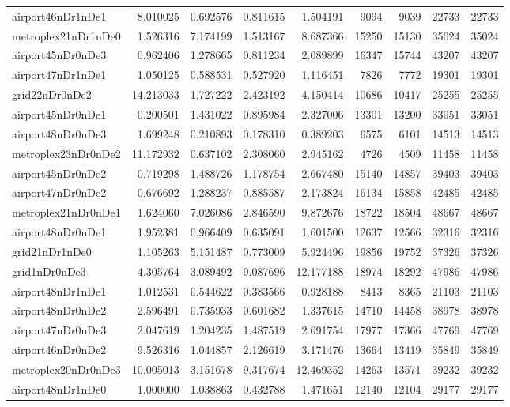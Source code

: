 \begin{longtable}{|l|r|r|r|r|r|r|r|r|}
airport46nDr1nDe1 & 8.010025 & 0.692576 & 0.811615 & 1.504191 & 9094 & 9039 & 22733 & 22733 \\
metroplex21nDr1nDe0 & 1.526316 & 7.174199 & 1.513167 & 8.687366 & 15250 & 15130 & 35024 & 35024 \\
airport45nDr0nDe3 & 0.962406 & 1.278665 & 0.811234 & 2.089899 & 16347 & 15744 & 43207 & 43207 \\
airport47nDr1nDe1 & 1.050125 & 0.588531 & 0.527920 & 1.116451 & 7826 & 7772 & 19301 & 19301 \\
grid22nDr0nDe2 & 14.213033 & 1.727222 & 2.423192 & 4.150414 & 10686 & 10417 & 25255 & 25255 \\
airport45nDr0nDe1 & 0.200501 & 1.431022 & 0.895984 & 2.327006 & 13301 & 13200 & 33051 & 33051 \\
airport48nDr0nDe3 & 1.699248 & 0.210893 & 0.178310 & 0.389203 & 6575 & 6101 & 14513 & 14513 \\
metroplex23nDr0nDe2 & 11.172932 & 0.637102 & 2.308060 & 2.945162 & 4726 & 4509 & 11458 & 11458 \\
airport45nDr0nDe2 & 0.719298 & 1.488726 & 1.178754 & 2.667480 & 15140 & 14857 & 39403 & 39403 \\
airport47nDr0nDe2 & 0.676692 & 1.288237 & 0.885587 & 2.173824 & 16134 & 15858 & 42485 & 42485 \\
metroplex21nDr0nDe1 & 1.624060 & 7.026086 & 2.846590 & 9.872676 & 18722 & 18504 & 48667 & 48667 \\
airport48nDr0nDe1 & 1.952381 & 0.966409 & 0.635091 & 1.601500 & 12637 & 12566 & 32316 & 32316 \\
grid21nDr1nDe0 & 1.105263 & 5.151487 & 0.773009 & 5.924496 & 19856 & 19752 & 37326 & 37326 \\
grid1nDr0nDe3 & 4.305764 & 3.089492 & 9.087696 & 12.177188 & 18974 & 18292 & 47986 & 47986 \\
airport48nDr1nDe1 & 1.012531 & 0.544622 & 0.383566 & 0.928188 & 8413 & 8365 & 21103 & 21103 \\
airport48nDr0nDe2 & 2.596491 & 0.735933 & 0.601682 & 1.337615 & 14710 & 14458 & 38978 & 38978 \\
airport47nDr0nDe3 & 2.047619 & 1.204235 & 1.487519 & 2.691754 & 17977 & 17366 & 47769 & 47769 \\
airport46nDr0nDe2 & 9.526316 & 1.044857 & 2.126619 & 3.171476 & 13664 & 13419 & 35849 & 35849 \\
metroplex20nDr0nDe3 & 10.005013 & 3.151678 & 9.317674 & 12.469352 & 14263 & 13571 & 39232 & 39232 \\
airport48nDr1nDe0 & 1.000000 & 1.038863 & 0.432788 & 1.471651 & 12140 & 12104 & 29177 & 29177 \\

\end{longtable}
